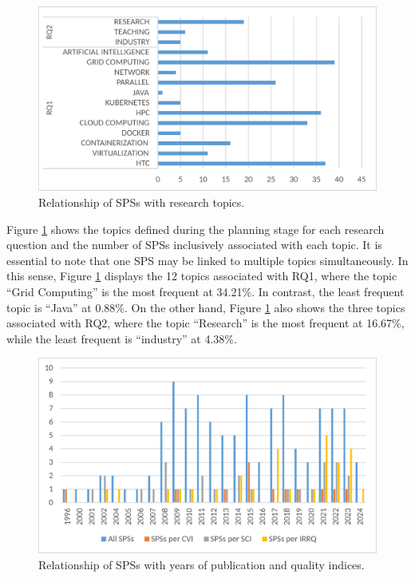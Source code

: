 \begin{figure}[htbp]
	\centering
	\includegraphics[scale=0.3]{resources/figures/Imagen3.eps}
	\caption{Relationship of SPSs with research topics.}
	\label{fig:SPSsByTopics}
\end{figure}

Figure \ref{fig:SPSsByTopics} shows the topics defined during the planning stage for each research question and the number of SPSs inclusively associated with each topic. It is essential to note that one SPS may be linked to multiple topics simultaneously. In this sense, Figure \ref{fig:SPSsByTopics} displays the 12 topics associated with RQ1, where the topic ``Grid Computing'' is the most frequent at 34.21\%. In contrast, the least frequent topic is ``Java'' at 0.88\%. On the other hand, Figure \ref{fig:SPSsByTopics} also shows the three topics associated with RQ2, where the topic ``Research'' is the most frequent at 16.67\%, while the least frequent is ``industry'' at 4.38\%.

\begin{figure}[htbp]
	\centering
	\includegraphics[scale=0.3]{resources/figures/Imagen4.eps}
	\caption{Relationship of SPSs with years of publication and quality indices.}
	\label{fig:SPSsByYearsAndIndexes}
\end{figure}

